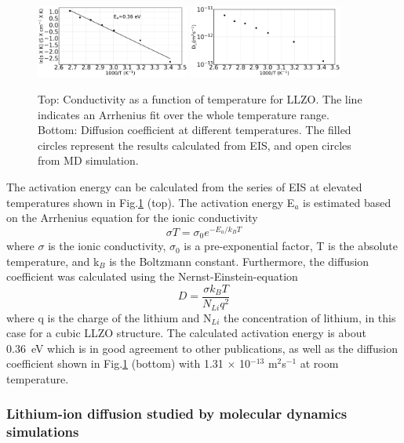 \documentclass[twoside,twocolumn,9pt]{article}
\begin{document}
\begin{figure}[t]
\centering
\includegraphics[width=0.45\textwidth]{Pics/arrhenius-plot.pdf}
\includegraphics[width=0.45\textwidth]{Pics/DiffusionCoefficient.pdf}
\caption{Top: Conductivity as a function of temperature for LLZO. The line indicates an Arrhenius fit over the whole temperature range. Bottom: Diffusion coefficient at different temperatures.
	The filled circles represent the results calculated from EIS, and open circles from MD simulation.}
\label{fig:arrhenius-plot}
\end{figure}


The activation energy can be calculated from the series of EIS at elevated temperatures shown in Fig.\ref{fig:arrhenius-plot} (top).
The activation energy E$_a$ is estimated based on the Arrhenius equation for the ionic conductivity
\begin{equation}
\sigma T = \sigma_0 e^{-E_a/k_B T}
\label{eq:Arrhenius-equation}
\end{equation}
where $\sigma$ is the ionic conductivity, $\sigma_0$ is a pre-exponential factor, T is the absolute temperature, and k$_B$ is the Boltzmann constant.
Furthermore, the diffusion coefficient was calculated using the Nernst-Einstein-equation
\begin{equation}
D=\frac{\sigma k_B T}{N_{Li} q^2}
\label{eq:Nernst-Einstein-equation}
\end{equation}
where q is the charge of the lithium and N$_{Li}$ the concentration of lithium, in this case for a cubic LLZO structure.
The calculated activation energy is about 0.36~eV which is in good agreement to other publications,
as well as the diffusion coefficient shown in Fig.\ref{fig:arrhenius-plot} (bottom) with 1.31 $\times$ 10$^{-13}$ m$^2$s$^{-1}$ at room temperature.





\subsubsection{Lithium-ion diffusion studied by molecular dynamics simulations}
\end{document}
